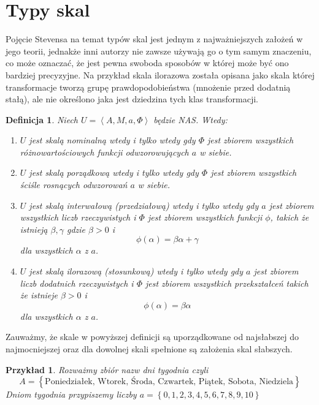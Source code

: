 \documentclass[12pt,a4paper]{report}
\newtheorem{definition}{Definicja}[chapter]
\newtheorem{przyklad}{Przykład}
\newcommand{\zbior}[1]{\left\lbrace {#1} \right\rbrace }
\newcommand{\tuple}[1]{\left\langle {#1} \right\rangle}
\begin{document}
\section{Typy skal}
Pojęcie Stevensa na temat typów skal jest jednym z najważniejszych założeń w jego teorii, jednakże inni autorzy nie zawsze używają go o tym samym znaczeniu, co może oznaczać, że jest pewna swoboda sposobów w której może być ono bardziej precyzyjne. Na przykład skala ilorazowa została opisana jako skala której transformacje tworzą grupę prawdopodobieństwa (mnożenie przed dodatnią stałą), ale nie określono jaka jest dziedzina tych klas transformacji.  
\begin{definition}
Niech $U=\tuple{A, M, a, \Phi}$ będzie NAS. Wtedy:
\begin{enumerate}
\item
$U$ jest skalą nominalną wtedy i tylko wtedy gdy $\Phi$ jest zbiorem wszystkich różnowartościowych funkcji odwzorowujących $a$ w siebie.
\item
$U$ jest skalą porządkową wtedy i tylko wtedy gdy $\Phi$ jest zbiorem wszystkich ściśle rosnących odwzorowań $a$ w siebie.
\item
$U$ jest skalą interwałową (przedziałową) wtedy i tylko wtedy gdy $a$ jest zbiorem wszystkich liczb rzeczywistych i $\Phi$ jest zbiorem wszystkich funkcji $\phi$, takich że istnieją $\beta,\gamma$ gdzie $\beta>0$ i
\begin{equation*}
\phi(\alpha)=\beta\alpha+\gamma
\end{equation*}
dla wszystkich $\alpha$ z $a$.
\item
$U$ jest skalą ilorazową (stosunkową) wtedy i tylko wtedy gdy $a$ jest zbiorem liczb dodatnich rzeczywistych i $\Phi$ jest zbiorem wszystkich przekształceń takich że istnieje $\beta>0$ i
\begin{equation*}
\phi(\alpha)=\beta\alpha
\end{equation*}
dla wszystkich $\alpha$ z $a$.
\end{enumerate}
\end{definition}

Zauważmy, że skale w powyższej definicji są uporządkowane od najsłabszej do najmocniejszej oraz dla dowolnej skali spełnione są założenia skal słabszych.

\begin{przyklad}
Rozważmy zbiór nazw dni tygodnia czyli
  $$
A=\zbior{\textrm{Poniedziałek, Wtorek, Środa, Czwartek, Piątek, Sobota, Niedziela}}
$$
Dniom tygodnia przypiszemy liczby $a=\zbior{0,1,2,3,4,5,6,7,8,9,10}$
\end{przyklad}
\end{document}
